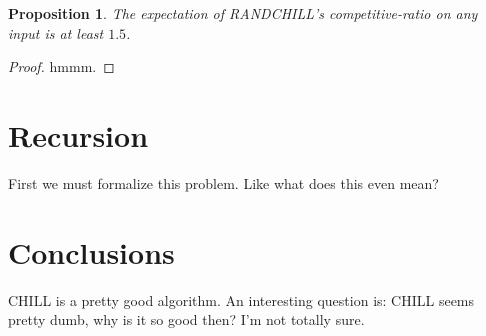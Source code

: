 \documentclass[twocolumn]{article}[11pt]
\newtheorem{proposition}{Proposition}
\begin{document}
\begin{proposition}
  The expectation of RANDCHILL's competitive-ratio on any input
  is at least $1.5$.
\end{proposition}
\begin{proof}
 hmmm. 
\end{proof}


\section{Recursion}
First we must formalize this problem. Like what does
this even mean?

\section{Conclusions}
CHILL is a pretty good algorithm. 
An interesting question is: CHILL seems pretty dumb, why is it
so good then? I'm not totally sure.



\end{document}
